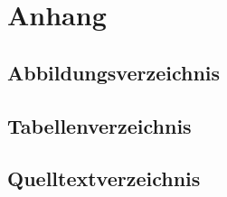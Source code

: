 \chapter{Anhang}
\renewcommand{\thesection}{\Alph{section}}

%
%

\printglossary[numberedsection, nonumberlist, type=\acronymtype, title=Abkürzungsverzeichnis]
\clearpage
{}

%
%

\makeatletter{}\makeatother
\section{Abbildungsverzeichnis}
\lofwithouttitle
\clearpage

%
%

\makeatletter{}\makeatother
\section{Tabellenverzeichnis}
\lotwithouttitle 
\clearpage

%
%

\makeatletter{}\makeatother
\section{Quelltextverzeichnis}
\lolwithouttitle
\clearpage

%
%


\clearpage

%
%

\printglossary[title=Glossar, type=main, nonumberlist]
\clearpage
{}

%
%

\makeatletter
\renewenvironment{thebibliography}[1]
     {\section{\bibname}
      \list{\@biblabel{\@arabic\c@enumiv}}
           {\settowidth\labelwidth{\@biblabel{#1}}
            \leftmargin\labelwidth
            \advance\leftmargin\labelsep
            \@openbib@code
            \usecounter{enumiv}%
            \let\p@enumiv\@empty
            \renewcommand\theenumiv{\@arabic\c@enumiv}}
      \sloppy
      \clubpenalty4000
      \@clubpenalty \clubpenalty
      \widowpenalty4000
      \sfcode`\.\@m}
     {\def\@noitemerr
       {\@latex@warning{Empty `thebibliography' environment}}%
      \endlist}
\makeatother

